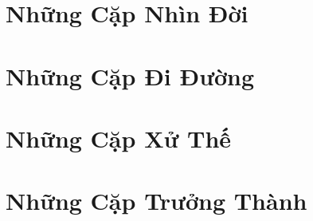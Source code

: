 \documentclass[14pt,a4paper,twoside]{extbook}
\begin{document}



\frontmatter
\tableofcontents
\clearpage


\mainmatter

\part{Những Cặp Nhìn Đời}






\part{Những Cặp Đi Đường}






\part{Những Cặp Xử Thế}






\part{Những Cặp Trưởng Thành}





\end{document}
